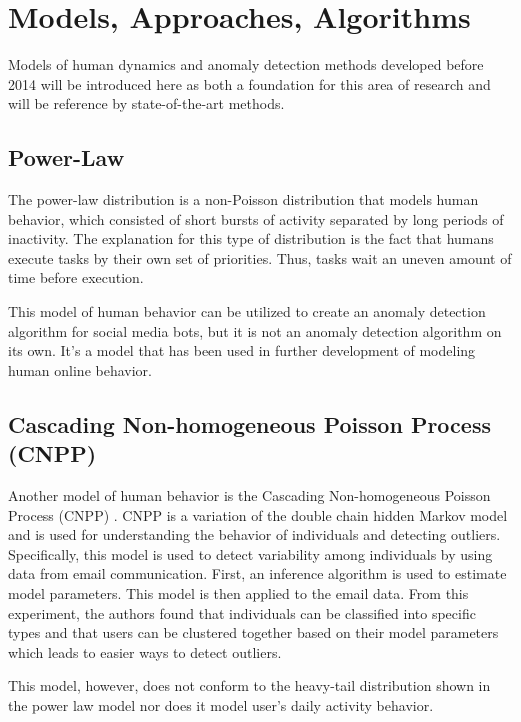 \documentclass[11pt, oneside]{article}   	%
\begin{document}
\section{Models, Approaches, Algorithms} \label{found_models}

\quad Models of human dynamics and anomaly detection methods  developed before 2014 will be introduced here as both a foundation for this area of research and will be reference by state-of-the-art methods. 

\subsection*{Power-Law }

\quad The power-law distribution \cite{powerlaw} is a non-Poisson distribution that models human behavior, which consisted of short bursts of activity separated by long periods of inactivity.
The explanation for this type of distribution is the fact that humans execute tasks by their own set of priorities.
Thus, tasks wait an uneven amount of time before execution. 

\quad This model of human behavior can be utilized to create an anomaly detection algorithm for social media bots, but it is not an anomaly detection algorithm on its own. It's a model that has been used in further development of modeling human online behavior.

\subsection*{Cascading Non-homogeneous Poisson Process (CNPP) }

\quad Another model of human behavior is the Cascading Non-homogeneous Poisson Process (CNPP) \cite{cnpp}. CNPP is a variation of the double chain hidden Markov model and is used for understanding the behavior of individuals and detecting outliers.
Specifically, this model is used to detect variability among individuals by using data from email communication.
First, an inference algorithm is used to estimate model parameters. 
This model is then applied to the email data.
From this experiment, the authors found that individuals can be classified into specific types and that users can be clustered together based on their model parameters which leads to easier ways to detect outliers.

\quad This model, however, does not conform to the heavy-tail distribution shown in the power law model nor does it model user's daily activity behavior.
\end{document}
